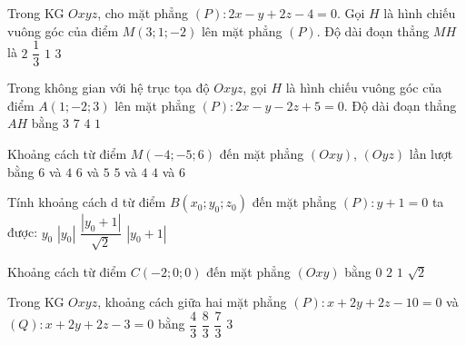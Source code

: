 \begin{ex}%
	Trong KG $Oxyz$, cho mặt phẳng $(P)\colon 2x-y+2z-4=0$. Gọi $H$ là hình chiếu vuông góc của điểm $M\left(3;1;-2\right)$ lên mặt phẳng $(P)$. Độ dài đoạn thẳng $MH$ là
	\choice
	{$2$}
	{$\dfrac{1}{3}$}
	{\True $1$}
	{$3$}
\end{ex}

\begin{ex}%
	Trong không gian với hệ trục tọa độ $Oxyz$, gọi $H$ là hình chiếu vuông góc của điểm $A(1;-2;3)$ lên mặt phẳng $(P)\colon 2x-y-2z+5=0$. Độ dài đoạn thẳng $AH$ bằng
	\choice
	{$3$}
	{$7$}
	{$4$}
	{$1$}
\end{ex}

\begin{ex}%
	Khoảng cách từ điểm $M(-4;-5;6)$ đến mặt phẳng $(Oxy)$, $(Oyz)$ lần lượt bằng
	\choice
	{\True $6$ và $4$}
	{$6$ và $5$}
	{$5$ và $4$}
	{$4$ và $6$}
\end{ex}

\begin{ex}%
	Tính khoảng cách $\mathrm{d}$ từ điểm $B\left(x_0;y_0;z_0\right)$ đến mặt phẳng $(P)\colon y + 1 = 0$ ta được:
	\choice
	{$y_0$}
	{$\left| y_0\right|$}
	{$\dfrac{\left| y_0+1\right|}{\sqrt{2}}$}
	{\True $\left| y_0+1\right|$}
\end{ex}

\begin{ex}%
	Khoảng cách từ điểm $C(-2;0;0)$ đến mặt phẳng $(Oxy)$ bằng
	\choice
	{\True $0$}
	{$2$}
	{$1$}
	{$\sqrt{2}$}
\end{ex}

\begin{ex}%
	Trong KG $Oxyz$, khoảng cách giữa hai mặt phẳng $(P)\colon x+2y+2z-10=0$ và $(Q)\colon x+2y+2z-3=0$ bằng
	\choice
	{$\dfrac{4}{3}$}
	{$\dfrac{8}{3}$}
	{\True $\dfrac{7}{3}$}
	{$3$}
\end{ex}

